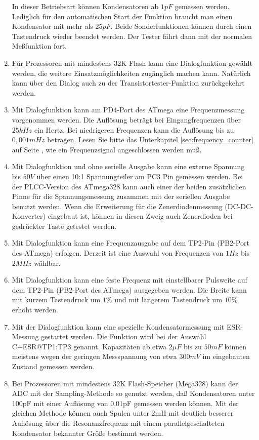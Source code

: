 \begin{enumerate}
In dieser Betriebsart können Kondensatoren ab \(1pF\) gemessen werden. Lediglich für den automatischen Start der Funktion
braucht man einen Kondensator mit mehr als \(25pF\).
Beide Sonderfunktionen können durch einen Tastendruck wieder beendet werden. Der Tester fährt dann mit der normalen
Meßfunktion fort.
\item Für Prozessoren mit mindestens 32K Flash kann eine Dialogfunktion gewählt werden, 
die weitere Einsatzmöglichkeiten zugänglich machen kann.
Natürlich kann über den Dialog auch zu der Transistortester-Funktion zurückgekehrt werden.
\item Mit Dialogfunktion kann am PD4-Port des ATmega eine Frequenzmessung vorgenommen werden.
Die Auflösung beträgt bei Eingangfrequenzen über \(25kHz\) ein Hertz.
Bei niedrigeren Frequenzen kann die Auflösung bis zu \(0,001mHz\) betragen.
Lesen Sie bitte das Unterkapitel \ref{sec:frequency_counter} auf Seite \pageref{sec:frequency_counter},
wie ein Frequenzsignal angeschlossen werden muß.
\item Mit Dialogfunktion und ohne serielle Ausgabe kann eine externe Spannung bis \(50V\) über einen
10:1 Spannungteiler am PC3 Pin gemessen werden. Bei der PLCC-Version des ATmega328 kann auch einer der beiden
zusätzlichen Pinne für die Spannungsmessung zusammen mit der seriellen Ausgabe benutzt werden.
Wenn die Erweiterung für die Zenerdiodenmessung (DC-DC-Konverter)
eingebaut ist, können in diesen Zweig auch Zenerdioden bei gedrückter Taste getestet werden.
\item Mit Dialogfunktion kann eine Frequenzausgabe auf dem TP2-Pin (PB2-Port des ATmega) erfolgen.
Derzeit ist eine Auswahl von Frequenzen von \(1Hz\) bis \(2MHz\) wählbar.
\item Mit Dialogfunktion kann eine feste Frequenz mit einstellbarer Pulsweite auf dem TP2-Pin (PB2-Port des ATmega)
ausgegeben werden.
Die Breite kann mit kurzem Tastendruck um \(1\%\) und mit längerem Tastendruck um \(10\%\) erhöht werden.
\item Mit der Dialogfunktion kann eine spezielle Kondensatormessung mit ESR-Messung gestartet werden.
Die Funktion wird bei der Auswahl \mbox{C+ESR@TP1:TP3} genannt.
 Kapazitäten ab etwa \(2\mu F\) bis zu \(50mF\) können meistens wegen der geringen Messspannung von etwa \(300mV\)
 im eingebauten Zustand gemessen werden.
\item Bei Prozessoren mit mindestens 32K Flash-Speicher (Mega328) kann der ADC mit der Sampling-Methode so genutzt werden,
daß Kondensatoren unter 100pF mit einer Auflösung von 0.01pF gemessen werden können. Mit der gleichen Methode können
auch Spulen unter 2mH mit deutlich besserer Auflösung über die Resonanzfrequenz mit einem parallelgeschalteten Kondensator 
bekannter Größe bestimmt werden.

\end{enumerate}

